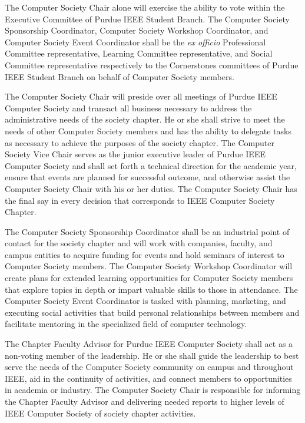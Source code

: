 \documentclass[12pt]{constitution}
\begin{document}
The Computer Society Chair alone will exercise the ability to vote within the Executive Committee of Purdue IEEE Student Branch. The Computer Society Sponsorship Coordinator, Computer Society Workshop Coordinator, and Computer Society Event Coordinator shall be the \textit{ex officio} Professional Committee representative, Learning Committee representative, and Social Committee representative respectively to the Cornerstones committees of Purdue IEEE Student Branch on behalf of Computer Society members.

The Computer Society Chair will preside over all meetings of Purdue IEEE Computer Society and transact all business necessary to address the administrative needs of the society chapter. He or she shall strive to meet the needs of other Computer Society members and has the ability to delegate tasks as necessary to achieve the purposes of the society chapter. The Computer Society Vice Chair serves as the junior executive leader of Purdue IEEE Computer Society and shall set forth a technical direction for the academic year, ensure that events are planned for successful outcome, and otherwise assist the Computer Society Chair with his or her duties. The Computer Society Chair has the final say in every decision that corresponds to IEEE Computer Society Chapter.

The Computer Society Sponsorship Coordinator shall be an industrial point of contact for the society chapter and will work with companies, faculty, and campus entities to acquire funding for events and hold seminars of interest to Computer Society members. The Computer Society Workshop Coordinator will create plans for extended learning opportunities for Computer Society members that explore topics in depth or impart valuable skills to those in attendance. The Computer Society Event Coordinator is tasked with planning, marketing, and executing social activities that build personal relationships between members and facilitate mentoring in the specialized field of computer technology.

The Chapter Faculty Advisor for Purdue IEEE Computer Society shall act as a non-voting member of the leadership. He or she shall guide the leadership to best serve the needs of the Computer Society community on campus and throughout IEEE, aid in the continuity of activities, and connect members to opportunities in academia or industry. The Computer Society Chair is responsible for informing the Chapter Faculty Advisor and delivering needed reports to higher levels of IEEE Computer Society of society chapter activities.
\end{document}

